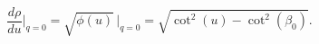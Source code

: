 \begin{equation}
  \frac{d \rho}{du}\Big|_{q=0} = \sqrt{\phi(u)}\,\Big|_{q=0} =
  \sqrt{\cot^2(u)-\cot^2(\beta_0)}.
\end{equation} 
